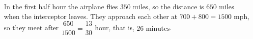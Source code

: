 In the first half hour the airplane flies $350$ miles, so the distance is $650$ miles when the interceptor leaves. They approach each other at $700+800=1500$ mph, so they meet after $\dfrac{650}{1500}=\dfrac{13}{30}$ hour, that is, $\boxed{26\text{ minutes}}$.
